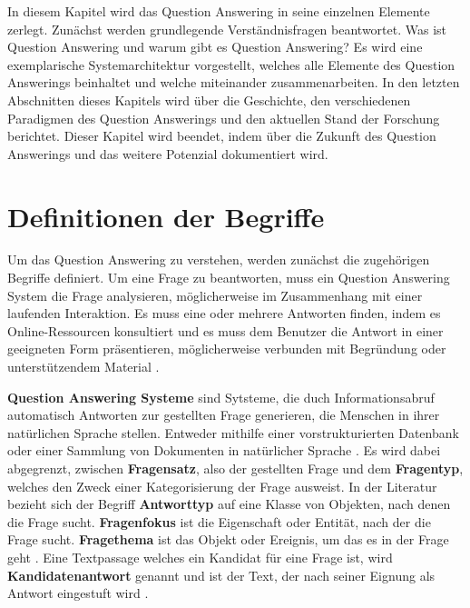 \documentclass[
        ngerman,
        paper=a4,
        numbers=noendperiod,
]{scrreprt}
\begin{document}
In diesem Kapitel wird das Question Answering in seine einzelnen Elemente zerlegt. Zunächst werden grundlegende Verständnisfragen beantwortet. Was ist Question Answering und warum gibt es Question Answering?
Es wird eine exemplarische Systemarchitektur vorgestellt, welches alle Elemente des Question Answerings beinhaltet und welche miteinander zusammenarbeiten. 
In den letzten Abschnitten dieses Kapitels wird über die Geschichte, den verschiedenen Paradigmen des Question Answerings und den aktuellen Stand der Forschung berichtet. Dieser Kapitel wird beendet, indem über die Zukunft des Question Answerings und das weitere Potenzial dokumentiert wird.
\section{Definitionen der Begriffe}
Um das Question Answering zu verstehen, werden zunächst die zugehörigen Begriffe definiert. Um eine Frage zu beantworten, muss ein Question Answering System die Frage analysieren, möglicherweise im Zusammenhang mit einer laufenden Interaktion. Es muss eine oder mehrere Antworten finden, indem es Online-Ressourcen konsultiert und es muss dem Benutzer die Antwort in einer geeigneten Form präsentieren, möglicherweise verbunden mit Begründung oder unterstützendem Material \citep[S. 276]{Hirschman2001NaturalHere}. 

\textbf{Question Answering Systeme} sind Sytsteme, die duch Informationsabruf automatisch Antworten zur gestellten Frage generieren, die Menschen in ihrer natürlichen Sprache stellen. Entweder mithilfe einer vorstrukturierten Datenbank oder einer Sammlung von Dokumenten in natürlicher Sprache \citep{Chali2011ImprovingKernels}\citep{Dwivedi2013ResearchSystem}\citep{Ansari2016IntelligentNetwork}\citep{Lende2016QuestionTechniques}. Es wird dabei abgegrenzt, zwischen \textbf{Fragensatz}, also der gestellten Frage und dem \textbf{Fragentyp}, welches den Zweck einer Kategorisierung der Frage ausweist. In der Literatur bezieht sich der Begriff \textbf{Antworttyp} auf eine Klasse von Objekten, nach denen die Frage sucht. \textbf{Fragenfokus} ist die Eigenschaft oder Entität, nach der die Frage sucht. \textbf{Fragethema} ist das Objekt oder Ereignis, um das es in der Frage geht \citep[S. 2]{CalijorneSoares2018ASystems}. Eine Textpassage welches ein Kandidat für eine Frage ist, wird \textbf{Kandidatenantwort} genannt und ist der Text, der nach seiner Eignung als Antwort eingestuft wird \citep{RetrievalOpen-DomainQuestion-Answering}.
\end{document}
